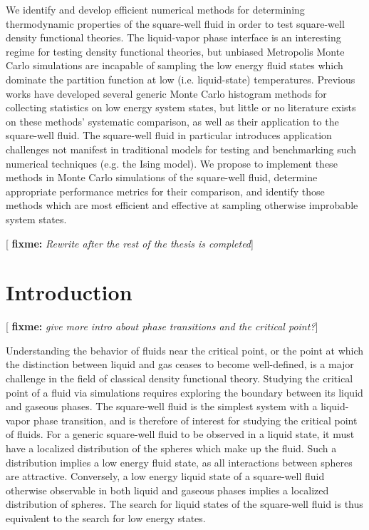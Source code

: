 \documentclass[11pt]{article}
\newcommand{\red}[1]{{\bf \color{red} #1}}
\newcommand{\fixme}[1]{[\red{fixme:} \emph{#1}]}
\begin{document}
\thispagestyle{abstract}

We identify and develop efficient numerical methods for determining
thermodynamic properties of the square-well fluid in order to test
square-well density functional theories. The liquid-vapor phase
interface is an interesting regime for testing density functional
theories, but unbiased Metropolis Monte Carlo simulations are
incapable of sampling the low energy fluid states which dominate the
partition function at low (i.e. liquid-state) temperatures. Previous
works have developed several generic Monte Carlo histogram methods for
collecting statistics on low energy system states, but little or no
literature exists on these methods' systematic comparison, as well as
their application to the square-well fluid. The square-well fluid in
particular introduces application challenges not manifest in
traditional models for testing and benchmarking such numerical
techniques (e.g. the Ising model). We propose to implement these
methods in Monte Carlo simulations of the square-well fluid, determine
appropriate performance metrics for their comparison, and identify
those methods which are most efficient and effective at sampling
otherwise improbable system states.

\fixme{Rewrite after the rest of the thesis is completed}


\newpage


\section{Introduction}
\label{sec:intro}

\fixme{give more intro about phase transitions and the critical
  point?}

Understanding the behavior of fluids near the critical point, or the
point at which the distinction between liquid and gas ceases to become
well-defined, is a major challenge in the field of classical density
functional theory. Studying the critical point of a fluid via
simulations requires exploring the boundary between its liquid and
gaseous phases. The square-well fluid is the simplest system with a
liquid-vapor phase transition, and is therefore of interest for
studying the critical point of fluids. For a generic square-well fluid
to be observed in a liquid state, it must have a localized
distribution of the spheres which make up the fluid. Such a
distribution implies a low energy fluid state, as all interactions
between spheres are attractive. Conversely, a low energy liquid state
of a square-well fluid otherwise observable in both liquid and gaseous
phases implies a localized distribution of spheres. The search for
liquid states of the square-well fluid is thus equivalent to the
search for low energy states.
\end{document}
